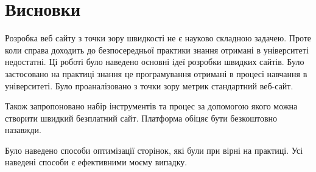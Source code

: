\newpage
\section*{Висновки}
\label{sec:conclusion}
    Розробка веб сайту з точки зору швидкості не є науково складною задачею.
Проте коли справа доходить до безпосередньої практики знання отримані в університеті недостатні.
Ці роботі було наведено основні ідеї розробки швидких сайтів.
Було застосовано на практиці знання це програмування отримані в процесі навчання в університеті.
Було проаналізовано з точки зору метрик стандартний веб-сайт.

Також запропоновано набір інструментів та процес за допомогою якого можна створити швидкий безплатний сайт.
Платформа обіцяє бути безкоштовно назавжди.

Було наведено способи оптимізації сторінок, які були при вірні на практиці. Усі наведені способи є ефективними моєму випадку.

